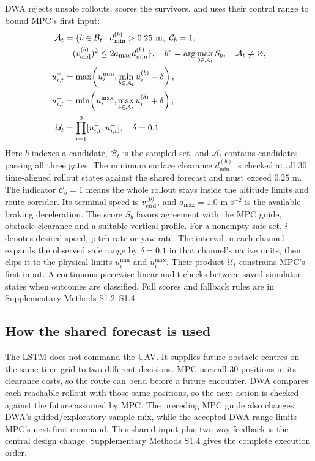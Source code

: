 \documentclass[conference,letterpaper]{IEEEtran}
\begin{document}
DWA rejects unsafe rollouts, scores the survivors, and uses their control range to bound MPC's first input:
\begingroup\small
\begin{equation}
\begin{aligned}
\mathcal A_t&=\{b\in\mathcal B_t:d_{\min}^{(b)}>0.25~\mathrm m,\ \mathcal C_b=1,\\
&\hspace{1em}(v_{\rm end}^{(b)})^2\leq2a_{\max}d_{\min}^{(b)}\},\quad
b^*=\arg\max_{b\in\mathcal A_t}S_b,\quad \mathcal A_t\ne\varnothing,\\
u_{i,t}^{-}&=\max\!\left(u_i^{\min},\min_{b\in\mathcal A_t}u_i^{(b)}-\delta\right),\\
u_{i,t}^{+}&=\min\!\left(u_i^{\max},\max_{b\in\mathcal A_t}u_i^{(b)}+\delta\right),\\
\mathcal U_t&=\prod_{i=1}^{3}[u_{i,t}^{-},u_{i,t}^{+}],\quad \delta=0.1.
\end{aligned}
\label{eq:dwa}
\end{equation}
\endgroup
Here $b$ indexes a candidate, $\mathcal B_t$ is the sampled set, and $\mathcal A_t$ contains candidates passing all three gates. The minimum surface clearance $d_{\min}^{(b)}$ is checked at all 30 time-aligned rollout states against the shared forecast and must exceed $0.25$ m. The indicator $\mathcal C_b=1$ means the whole rollout stays inside the altitude limits and route corridor. Its terminal speed is $v_{\rm end}^{(b)}$, and $a_{\max}=1.0$ m s$^{-2}$ is the available braking deceleration. The score $S_b$ favors agreement with the MPC guide, obstacle clearance and a suitable vertical profile. For a nonempty safe set, $i$ denotes desired speed, pitch rate or yaw rate. The interval in each channel expands the observed safe range by $\delta=0.1$ in that channel's native units, then clips it to the physical limits $u_i^{\min}$ and $u_i^{\max}$. Their product $\mathcal U_t$ constrains MPC's first input. A continuous piecewise-linear audit checks between saved simulator states when outcomes are classified. Full scores and fallback rules are in Supplementary Methods S1.2--S1.4.

\subsection{How the shared forecast is used}
The LSTM does not command the UAV. It supplies future obstacle centres on the same time grid to two different decisions. MPC uses all 30 positions in its clearance costs, so the route can bend before a future encounter. DWA compares each reachable rollout with those same positions, so the next action is checked against the future assumed by MPC. The preceding MPC guide also changes DWA's guided/exploratory sample mix, while the accepted DWA range limits MPC's next first command. This shared input plus two-way feedback is the central design change. Supplementary Methods S1.4 gives the complete execution order.
\end{document}
